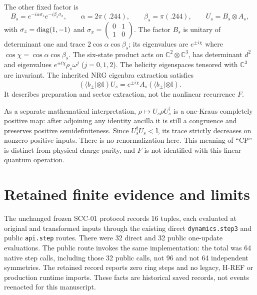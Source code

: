 \documentclass[11pt,a4paper]{article}
\numberwithin{equation}{section}
\newcommand{\C}{\mathbb C}\newcommand{\R}{\mathbb R}
\newcommand{\I}{\mathbb I}\newcommand{\Argz}{\operatorname{Arg}_0}
\begin{document}
The other fixed factor is
\begin{equation}
 B_s=e^{-i\alpha\sigma_z}e^{-i\beta_s\sigma_x},\qquad
 \alpha=2\pi(.244),\qquad\beta_s=\pi(.244),\qquad U_s=B_s\otimes A_s,
\end{equation}
with $\sigma_z=\operatorname{diag}(1,-1)$ and $\sigma_x=\left(\begin{smallmatrix}0&1\\1&0\end{smallmatrix}\right)$. The factor $B_s$ is unitary of determinant one and trace $2\cos\alpha\cos\beta_s$; its eigenvalues are $e^{\pm i\chi}$ where $\cos\chi=\cos\alpha\cos\beta_s$. The six-state product acts on $\C^2\otimes\C^3$, has determinant $d^2$ and eigenvalues $e^{\pm i\chi}\rho_s\omega^j$ ($j=0,1,2$). The helicity eigenspaces tensored with $\C^3$ are invariant. The inherited NRG eigenbra extraction satisfies
\begin{equation}
 (\langle b_\pm|\otimes\I)U_s=e^{\pm i\chi}A_s(\langle b_\pm|\otimes\I).
\end{equation}
It describes preparation and sector extraction, not the nonlinear recurrence $F$.

As a separate mathematical interpretation, $\rho\mapsto U_s\rho U_s^\dagger$ is a one-Kraus completely positive map: after adjoining any identity ancilla it is still a congruence and preserves positive semidefiniteness. Since $U_s^\dagger U_s<\I$, its trace strictly decreases on nonzero positive inputs. There is no renormalization here. This meaning of ``CP'' is distinct from physical charge-parity, and $F$ is not identified with this linear quantum operation.

\section{Retained finite evidence and limits}\label{sec:evidence}
The unchanged frozen SCC-01 protocol records 16 tuples, each evaluated at original and transformed inputs through the existing direct \texttt{dynamics.step3} and public \texttt{api.step} routes. There were 32 direct and 32 public one-update evaluations. The public route invokes the same implementation: the total was 64 native step calls, including those 32 public calls, not 96 and not 64 independent symmetries. The retained record reports zero ring steps and no legacy, H-REF or production runtime imports. These facts are historical saved records, not events reenacted for this manuscript.
\end{document}
